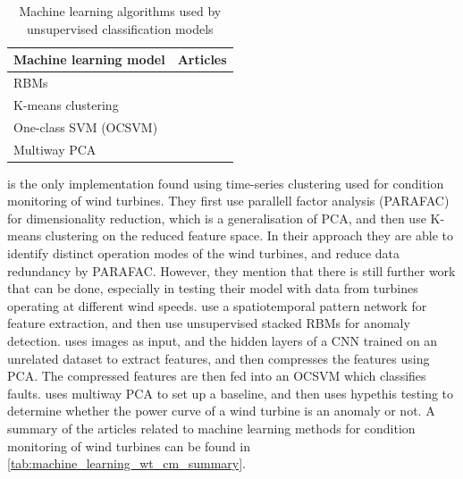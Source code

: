 \begin{table}[h]
    \centering
    \begin{tabular}{p{}p{}}
        \toprule
        Machine learning model & Articles \\
        \midrule
        RBMs                    & \cite{unsup_graphical_modeling_wt_cm} \\
        K-means clustering      & \cite{fault_detect_PARAFAC_k_means} \\
        One-class SVM (OCSVM)   & \cite{unsupervised_AD_blade_damage_deep_features_images} \\
        Multiway PCA            & \cite{multiway_PCA_multivar_inference_cm_wt} \\
        \bottomrule
    \end{tabular}
    \caption{Machine learning algorithms used by unsupervised classification models}
    \label{tab:sup_classification_ml_models}
\end{table}

\textcite{fault_detect_PARAFAC_k_means} is the only implementation found using time-series clustering used for condition monitoring of wind turbines. 
They first use parallell factor analysis (PARAFAC) for dimensionality reduction, which is a generalisation of PCA, and then use K-means clustering on the reduced feature space. 
In their approach they are able to identify distinct operation modes of the wind turbines, and reduce data redundancy by PARAFAC. 
However, they mention that there is still further work that can be done, especially in testing their model with data from turbines operating at different wind speeds. 
\textcite{unsup_graphical_modeling_wt_cm} use a spatiotemporal pattern network for feature extraction, and then use unsupervised stacked RBMs for anomaly detection. 
\textcite{unsupervised_AD_blade_damage_deep_features_images} uses images as input, and the hidden layers of a CNN trained on an unrelated dataset to extract features, and then compresses the features using PCA. 
The compressed features are then fed into an OCSVM which classifies faults. 
\textcite{multiway_PCA_multivar_inference_cm_wt} uses multiway PCA to set up a baseline, and then uses hypethis testing to determine whether the power curve of a wind turbine is an anomaly or not. 
A summary of the articles related to machine learning methods for condition monitoring of wind turbines can be found in \ref{tab:machine_learning_wt_cm_summary}.

